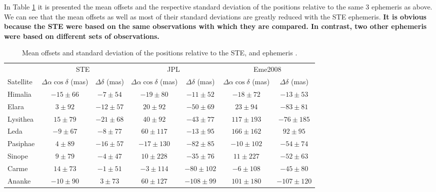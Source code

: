 \documentclass[useAMS,usenatbib]{mn2e}
\begin{document}
In Table \ref{Tab:STE-error} it is presented the mean offsets and the respective standard deviation of the  positions relative to the same 3 ephemeris as above. We can see that the mean offsets as well as most of their standard deviations are greatly reduced with the STE ephemeris. \textbf{It is obvious because the STE were based on the same observations with which they are compared. In contrast, two other ephemeris
were based on different sets of observations.}

\begin{table}
\caption{\label{Tab:STE-error} Mean offsets and standard deviation of the \protect{} positions relative to the STE, \protect\cite{Jacobson2012} and \protect\cite{Emelyanov2005} ephemeris .}
\begin{centering}
\begin{tabular}{l|cc|cc|cc}
\hline  \hline
 & \multicolumn{2}{|c|}{STE} & \multicolumn{2}{|c|}{JPL} & \multicolumn{2}{|c}{Eme2008}\tabularnewline
Satellite  & $\Delta\alpha\cos\delta$ (mas) & $\Delta\delta$ (mas) & $\Delta\alpha\cos\delta$ (mas) & $\Delta\delta$ (mas) & $\Delta\alpha\cos\delta$ (mas) & $\Delta\delta$ (mas) \tabularnewline
\hline
Himalia & $-15\pm66$ & $-7\pm54$  & $-19\pm80$  & $-11\pm52$ & $-18\pm72$  & $-13\pm53$ \tabularnewline
Elara & $3\pm92$ & $-12\pm57$ & $20\pm92$ & $-50\pm69$ & $23\pm94$ & $-83\pm81$ \tabularnewline
Lysithea & $15\pm79$ & $-21\pm68$ & $40\pm92$ & $-43\pm77$ & $117\pm193$ & $-76\pm185$ \tabularnewline
Leda & $-9\pm67$ & $-8\pm77$ & $60\pm117$ & $-13\pm95$ & $166\pm162$ & $92\pm95$ \tabularnewline
Pasiphae & $4\pm89$ & $-16\pm57$ & $-17\pm130$ & $-82\pm85$ & $-10\pm102$ & $-54\pm74$ \tabularnewline
Sinope & $9\pm79$ & $-4\pm47$ & $10\pm228$ & $-35\pm76$ & $11\pm227$ & $-52\pm63$ \tabularnewline
Carme & $14\pm73$ & $-1\pm51$ & $-3\pm114$ & $-80\pm102$ & $-6\pm108$ & $-45\pm80$ \tabularnewline
Ananke & $-10\pm90$ & $3\pm73$ & $60\pm127$ & $-108\pm99$ & $101\pm180$ & $-107\pm120$ \tabularnewline
\hline
\end{tabular}
\par \end{centering}
\end{table}
\end{document}
